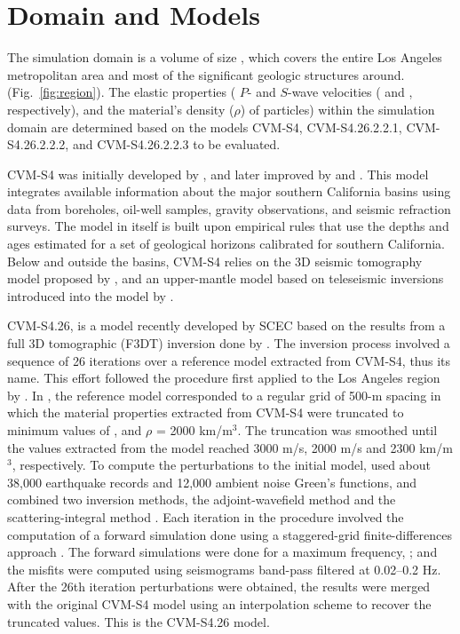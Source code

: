 
\section{Domain and Models}

The simulation domain is a volume of size , which covers the entire Los Angeles metropolitan area and most of the significant geologic structures around. (Fig.~\ref{fig:region}). 
The elastic properties ( $P$- and $S$-wave velocities (\vp{} and \vs{}, respectively), and the material's density ($\rho$) of particles) within the simulation domain are determined based on the models CVM-S4, CVM-S4.26.2.2.1, CVM-S4.26.2.2.2, and CVM-S4.26.2.2.3 to be evaluated. 

CVM-S4 was initially developed by \citet{Magistrale_1996_BSSA}, and later improved by \citet{Magistrale_2000_BSSA} and \citet{Kohler_2003_BSSA}. This model integrates available information about the major southern California basins using data from boreholes, oil-well samples, gravity observations, and seismic refraction surveys. The model in itself is built upon empirical rules that use the depths and ages estimated for a set of geological horizons calibrated for southern California. Below and outside the basins, CVM-S4 relies on the 3D seismic tomography model proposed by \citet{Hauksson_2000_JGR}, and an upper-mantle model based on teleseismic inversions introduced into the model by \citet{Kohler_2003_BSSA}.

CVM-S4.26, is a model recently developed by SCEC based on the results from a full 3D tomographic (F3DT) inversion done by \citet{Lee_2014_JGR}. The inversion process involved a sequence of 26 iterations over a reference model extracted from CVM-S4, thus its name. This effort followed the procedure first applied to the Los Angeles region by \citet{Chen_2007_BSSA}. In \citet{Lee_2014_JGR}, the reference model corresponded to a regular grid of 500-m spacing in which the material properties extracted from CVM-S4 were truncated to minimum values of ,  and $\rho$ = 2000 km/m$^3$. The truncation was smoothed until the values extracted from the model reached 3000 m/s, 2000 m/s and 2300 km/m$^3$, respectively. To compute the perturbations to the initial model, \citet{Lee_2014_JGR} used about 38,000 earthquake records and 12,000 ambient noise Green's functions, and combined two inversion methods, the adjoint-wavefield method \citep[AW-F3DT;][]{Tromp_2005_GJI} and the scattering-integral method \citep[SI-F3DT;][]{Zhao_2005_BSSA}. Each iteration in the procedure involved the computation of a forward simulation done using a staggered-grid finite-differences approach \citep{Olsen_1994_Thesis}. The forward simulations were done for a maximum frequency, ; and the misfits were computed using seismograms band-pass filtered at 0.02--0.2 Hz. After the 26th iteration perturbations were obtained, the results were merged with the original CVM-S4 model using an interpolation scheme to recover the truncated values. This is the CVM-S4.26 model.


